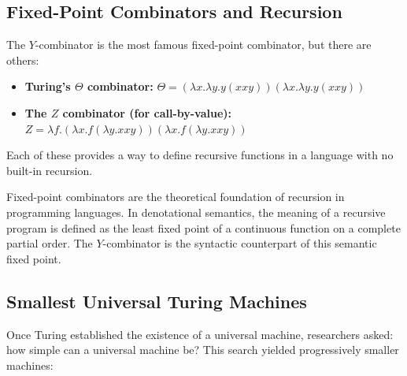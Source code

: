 \subsection{Fixed-Point Combinators and Recursion}
\label{sec:computation:fixedpoint}

The $Y$-combinator is the most famous fixed-point combinator, but there are others:

\begin{itemize}
\item \textbf{Turing's $\Theta$ combinator:} $\Theta = (\lambda x.\lambda y. y(x x y))(\lambda x.\lambda y. y(x x y))$
\item \textbf{The $Z$ combinator (for call-by-value):} $Z = \lambda f.(\lambda x. f(\lambda y. x x y))(\lambda x. f(\lambda y. x x y))$
\end{itemize}

Each of these provides a way to define recursive functions in a language with no built-in recursion.

Fixed-point combinators are the theoretical foundation of recursion in programming languages. In denotational semantics, the meaning of a recursive program is defined as the least fixed point of a continuous function on a complete partial order. The $Y$-combinator is the syntactic counterpart of this semantic fixed point.

\subsection{Smallest Universal Turing Machines}
\label{sec:computation:smallest}

Once Turing established the existence of a universal machine, researchers asked: how simple can a universal machine be? This search yielded progressively smaller machines:

